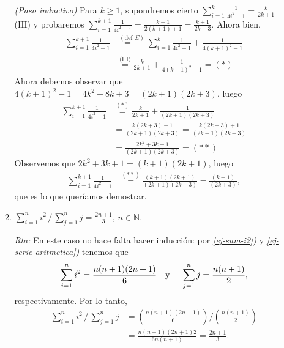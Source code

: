\documentclass[a4paper,12pt,twoside,spanish,reqno]{amsbook}
\numberwithin{equation}{section}
\newcommand{\rta}{\noindent\textit{Rta: }}
\begin{document}
\begin{enumerate}
\begin{enumerate}
            \textit{(Paso inductivo) }  Para  $k \ge 1$,  supondremos cierto $\sum_{i=1}^k \frac{1}{4i^2-1} = \frac{k}{2k+1}$ (HI) y probaremos $\sum_{i=1}^{k+1} \frac{1}{4i^2-1} = \frac{k+1}{2(k+1)+1} = \frac{k+1}{2k+3}$. Ahora bien,
            \begin{align*}
            \sum_{i=1}^{k+1} \frac{1}{4i^2-1} &\overset{(\text{def } \Sigma)}{=\quad}\sum_{i=1}^{k} \frac{1}{4i^2-1} +  \frac{1}{4(k+1)^2-1}\\
            &\overset{\text{(HI)}}{=} \frac{k}{2k+1} + \frac{1}{4(k+1)^2-1} = (*)
            \end{align*}
            Ahora debemos observar que $4(k+1)^2-1 = 4k^2 +8k+3 = (2k+1)(2k+3)$, luego
            \begin{align*}
            \sum_{i=1}^{k+1} \frac{1}{4i^2-1} &\overset{(*)}{=} \frac{k}{2k+1} + \frac{1}{(2k+1)(2k+3)} \\
            &=  \frac{k(2k+3) +1}{(2k+1)(2k+3)} = \frac{k(2k+3) +1}{(2k+1)(2k+3)} \\
            &=  \frac{2k^2+3k +1}{(2k+1)(2k+3)}  = (**)
            \end{align*}
            Observemos  que $2k^2+3k +1 = (k+1)(2k+1)$, luego
            \begin{align*}
            \sum_{i=1}^{k+1} \frac{1}{4i^2-1} &\overset{(**)}{=} \frac{(k+1)(2k+1)}{(2k+1)(2k+3)} = \frac{(k+1)}{(2k+3)},
            \end{align*}
            que es lo que queríamos demostrar.
            
            \item $\displaystyle{ \sum_{i=1}^n i^2\, /\, \sum_{j=1}^n j = \frac{2n+1}{3}}$, $n\in \mathbb N$.
            
            \rta En  este caso no hace falta hacer inducción: por \textit{ \ref{ej-sum-i2})} y \textit{\ref{ej-serie-aritmetica})} tenemos que 
            \begin{equation*}
                \sum_{i=1}^n i^2 = \frac{n(n+1)(2n+1)}{6} \text{\quad y \quad} \sum_{j=1}^n j = \frac{n(n+1)}{2},
            \end{equation*}
            respectivamente. Por  lo tanto, 
            \begin{align*}
                \sum_{i=1}^n i^2\, /\, \sum_{j=1}^n j &= \left(\frac{n(n+1)(2n+1)}{6}\right) / \left(\frac{n(n+1)}{2}\right) \\
                &= \frac{n(n+1)(2n+1)2}{6n(n+1)} = \frac{2n+1}{3}.
            \end{align*}
            

\end{enumerate}
\end{enumerate}
\end{document}
